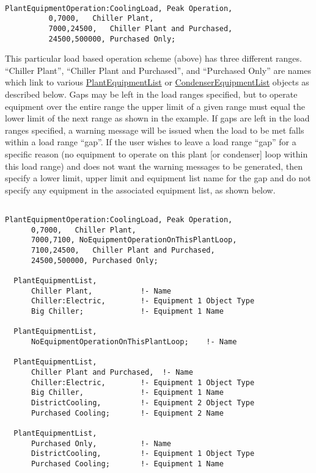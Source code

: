 \begin{lstlisting}

PlantEquipmentOperation:CoolingLoad, Peak Operation,
          0,7000,   Chiller Plant,
          7000,24500,   Chiller Plant and Purchased,
          24500,500000, Purchased Only;
\end{lstlisting}

This particular load based operation scheme (above) has three different ranges. ``Chiller Plant'', ``Chiller Plant and Purchased'', and ``Purchased Only'' are names which link to various \hyperref[plantequipmentlist]{PlantEquipmentList} or \hyperref[condenserequipmentlist]{CondenserEquipmentList} objects as described below. Gaps may be left in the load ranges specified, but to operate equipment over the entire range the upper limit of a given range must equal the lower limit of the next range as shown in the example. If gaps are left in the load ranges specified, a warning message will be issued when the load to be met falls within a load range ``gap''. If the user wishes to leave a load range ``gap'' for a specific reason (no equipment to operate on this plant {[}or condenser{]} loop within this load range) and does not want the warning messages to be generated, then specify a lower limit, upper limit and equipment list name for the gap and do not specify any equipment in the associated equipment list, as shown below.

\begin{lstlisting}

PlantEquipmentOperation:CoolingLoad, Peak Operation,
      0,7000,   Chiller Plant,
      7000,7100, NoEquipmentOperationOnThisPlantLoop,
      7100,24500,   Chiller Plant and Purchased,
      24500,500000, Purchased Only;

  PlantEquipmentList,
      Chiller Plant,           !- Name
      Chiller:Electric,        !- Equipment 1 Object Type
      Big Chiller;             !- Equipment 1 Name

  PlantEquipmentList,
      NoEquipmentOperationOnThisPlantLoop;    !- Name

  PlantEquipmentList,
      Chiller Plant and Purchased,  !- Name
      Chiller:Electric,        !- Equipment 1 Object Type
      Big Chiller,             !- Equipment 1 Name
      DistrictCooling,         !- Equipment 2 Object Type
      Purchased Cooling;       !- Equipment 2 Name

  PlantEquipmentList,
      Purchased Only,          !- Name
      DistrictCooling,         !- Equipment 1 Object Type
      Purchased Cooling;       !- Equipment 1 Name
\end{lstlisting}

